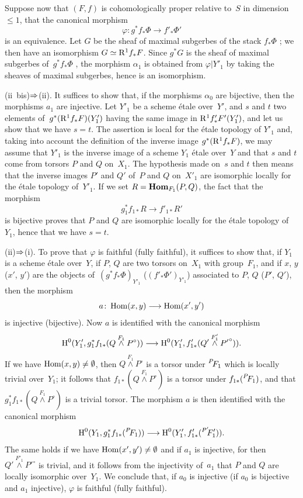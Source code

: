 Suppose now that $(F,f)$ is cohomologically proper
relative to~$S$ in dimension $\leqslant 1$, \ie that the
canonical morphism
$$
\varphi \colon g^* f_* \Phi \to f'_* \Phi'
$$
is an equivalence. Let $G$ be the sheaf of maximal subgerbes
of the stack $f_* \Phi$ \hbox{\cite[III~2.1.8]{XIII.1}}; we then have an
isomorphism $G \simeq \mathrm{R}^1 f_* F$. Since $g^* G$ is the
sheaf of maximal subgerbes of~$g^* f_* \Phi$ \cite[III
2.1.5.5]{XIII.2}, the morphism $\alpha_1$ is obtained from
$\varphi|Y'_1$ by taking the sheaves of maximal subgerbes,
hence is an isomorphism.

(ii~bis)$\To$(ii). It suffices to show that, if the
morphisms $\alpha_0$ are bijective, then the morphisms $a_1$ are
injective. Let $Y'_1$ be a scheme \'etale over~$Y'$, and
$s$ and $t$ two elements of~$g^*(\mathrm{R}^1 f_* F)(Y'_1)$
having the same image in $\mathrm{R}^1 f'_* F'(Y'_1)$, and let us show that
we have $s=t$. The assertion is local for the \'etale topology of
$Y'_1$ and, taking into account the definition of the inverse image
$g^*(\mathrm{R}^1 f_* F)$, we may assume that $Y'_1$ is the inverse
image of a scheme $Y_1$ \'etale over~$Y$ and that $s$ and
$t$ come from torsors $P$ and $Q$ on~$X_1$. The hypothesis
made on~$s$ and $t$ then means that the inverse images $P'$ and
$Q'$ of~$P$ and $Q$ on~$X'_1$ are isomorphic locally for the
\'etale topology of~$Y'_1$. If we set $R =
\operatorname{\mathbf{Hom}}_{F_1}(P,Q)$, the fact that the morphism
$$
g_1^* f_{1 *} R \to f'_{1 *} R'
$$
is bijective proves that $P$ and $Q$ are isomorphic locally for the
\'etale topology of~$Y_1$, hence that we have $s=t$.

(ii)$\To$(i). To prove that $\varphi$ is faithful
(\resp fully faithful), it suffices to show that, if $Y_1$ is
a scheme \'etale over~$Y$, if $P$, $Q$ are two torsors on~$X_1$ with group~$F_1$, and if $x$, $y$ (\resp $x'$, $y'$) are the objects
of~$(g^* f_* \Phi)_{Y'_1}$ (\resp $(f'_* \Phi')_{Y'_1}$)
associated to $P$, $Q$ (\resp $P'$, $Q'$), then the morphism
$$
a \colon \Hom(x,y) \to \Hom(x',y')
$$
is injective (\resp bijective). Now $a$ is identified with the
canonical morphism
$$
\H^0(Y'_1,g^*_1 f_{1 *} (Q \overset{F_1}{\wedge} P^\circ)) \to
\H^0(Y'_1, f'_{1 *}(Q' \overset{F'_1}{\wedge} {P'}^\circ))\text{.}
$$
If
we have $\operatorname{Hom}(x,y) \neq \emptyset$, then $Q \overset{F_1}{\wedge}
P^\circ$ is a torsor under $\leftexp{P\mkern-4mu}{F}_1$ which is locally trivial over~$Y_1$; it follows that $f_{1 *}(Q \overset{F_1}{\wedge}
P^\circ)$ is a torsor under $f_{1*}(\leftexp{P\mkern-4mu}{F}_1)$, and that
$g^*_1 f_{1 *} (Q \overset{F_1}{\wedge} P^\circ)$ is a trivial
torsor. The morphism $a$ is then identified with the canonical morphism
$$
\H^0(Y_1, g^*_1 f_{1 *}(\leftexp{P\mkern-4mu}{F}_1)) \to \H^0 (Y'_1,
f'_{1 *}(\leftexp{P'\mkern-6mu}{F}'_1)) \text{.}
$$
The same holds if we have $\operatorname{Hom}(x',y') \neq \emptyset$ and if
$a_1$ is injective, for then $Q' \overset{F'_1}{\wedge} {P'}^\circ$
is trivial, and it follows from the injectivity of~$a_1$ that $P$
and $Q$ are locally isomorphic over~$Y_1$. We conclude that, if
$a_0$ is injective (\resp if $a_0$ is bijective and $a_1$ injective),
$\varphi$ is faithful (\resp fully faithful).

